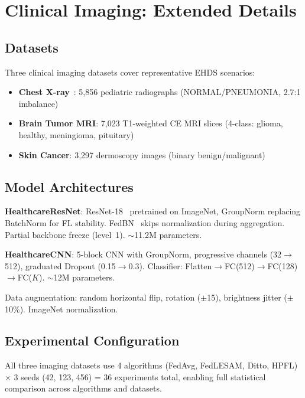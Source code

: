 \documentclass[conference]{IEEEtran}
\begin{document}
\section{Clinical Imaging: Extended Details}
\label{sec:imaging}

\subsection{Datasets}

Three clinical imaging datasets cover representative EHDS scenarios:
\begin{itemize}
    \item \textbf{Chest X-ray}~\cite{chestxray2018}: 5,856 pediatric radiographs (NORMAL/PNEUMONIA, 2.7:1 imbalance)
    \item \textbf{Brain Tumor MRI}: 7,023 T1-weighted CE MRI slices (4-class: glioma, healthy, meningioma, pituitary)
    \item \textbf{Skin Cancer}: 3,297 dermoscopy images (binary benign/malignant)
\end{itemize}

\subsection{Model Architectures}

\textbf{HealthcareResNet}: ResNet-18~\cite{he2016deep} pretrained on ImageNet, GroupNorm replacing BatchNorm for FL stability. FedBN~\cite{li2021fedbn} skips normalization during aggregation. Partial backbone freeze (level~1). $\sim$11.2M parameters.

\textbf{HealthcareCNN}: 5-block CNN with GroupNorm, progressive channels (32$\to$512), graduated Dropout (0.15$\to$0.3). Classifier: Flatten$\to$FC(512)$\to$FC(128)$\to$FC($K$). $\sim$12M parameters.

Data augmentation: random horizontal flip, rotation ($\pm$15\textdegree), brightness jitter ($\pm$10\%). ImageNet normalization.

\subsection{Experimental Configuration}

All three imaging datasets use 4 algorithms (FedAvg, FedLESAM, Ditto, HPFL) $\times$ 3 seeds (42, 123, 456) = 36 experiments total, enabling full statistical comparison across algorithms and datasets.
\end{document}
